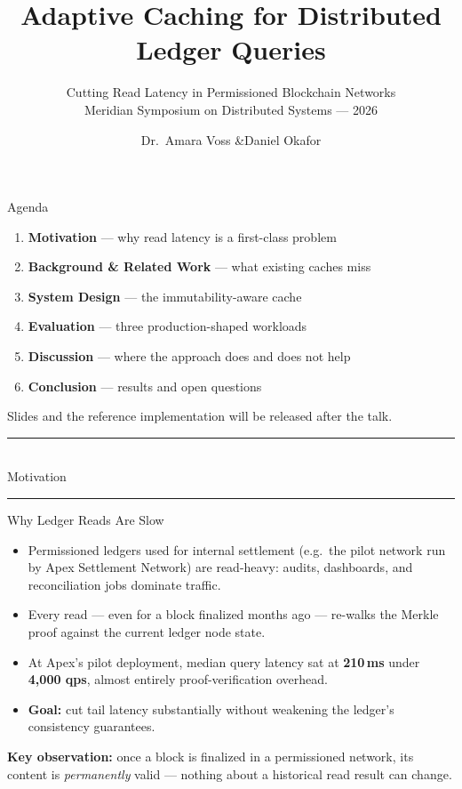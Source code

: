 \documentclass[pdf]{prosper}
\title{Adaptive Caching for Distributed Ledger Queries}
\subtitle{Cutting Read Latency in Permissioned Blockchain Networks \\[2pt]
\normalsize Meridian Symposium on Distributed Systems --- 2026}
\author{Dr.~Amara Voss \quad\&\quad Daniel Okafor}
\newcommand{\Divider}[1]{%
\begin{slide}{}
\vspace{2.2cm}
\begin{center}
{\color{softgray}\rule{6cm}{0.4pt}}\\[0.5cm]
{\usefont{T1}{phv}{b}{n}\selectfont\color{deepnavy}\Huge #1}\\[0.4cm]
{\color{softgray}\rule{6cm}{0.4pt}}
\end{center}
\end{slide}%
}
\begin{document}
\maketitle

\begin{slide}{Agenda}
\vspace{0.4cm}
\begin{enumerate}
\item \textcolor{deepnavy}{\textbf{Motivation}} --- why read latency is a first-class problem
\item \textcolor{deepnavy}{\textbf{Background \& Related Work}} --- what existing caches miss
\item \textcolor{deepnavy}{\textbf{System Design}} --- the immutability-aware cache
\item \textcolor{deepnavy}{\textbf{Evaluation}} --- three production-shaped workloads
\item \textcolor{deepnavy}{\textbf{Discussion}} --- where the approach does and does not help
\item \textcolor{deepnavy}{\textbf{Conclusion}} --- results and open questions
\end{enumerate}
\vfill
{\small\color{softgray} Slides and the reference implementation will be released after the talk.}
\end{slide}

\Divider{Motivation}

\begin{slide}{Why Ledger Reads Are Slow}
\begin{itemize}
\item Permissioned ledgers used for internal settlement (e.g.\ the pilot network run by Apex Settlement Network) are read-heavy: audits, dashboards, and reconciliation jobs dominate traffic.
\item Every read --- even for a block finalized months ago --- re-walks the Merkle proof against the current ledger node state.
\item At Apex's pilot deployment, median query latency sat at \textbf{210\,ms} under \textbf{4{,}000 qps}, almost entirely proof-verification overhead.
\item \textbf{Goal:} cut tail latency substantially without weakening the ledger's consistency guarantees.
\end{itemize}
\vspace{0.5cm}
\begin{tcolorbox}[colback=paperwhite,colframe=slateblue,boxrule=0.6pt,arc=2pt,left=8pt,right=8pt,top=6pt,bottom=6pt]
\textbf{\textcolor{deepnavy}{Key observation:}} once a block is finalized in a permissioned network, its content is \emph{permanently} valid --- nothing about a historical read result can change.
\end{tcolorbox}
\end{slide}
\end{document}
